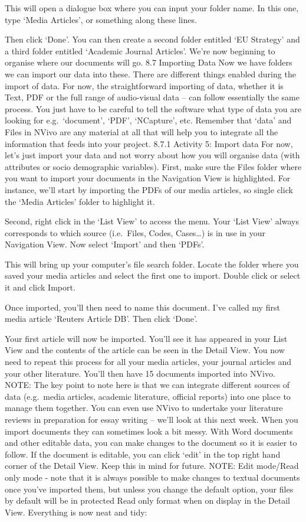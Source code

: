 \documentclass[
]{book}
\begin{document}
This will open a dialogue box where you can input your folder name. In this one, type `Media Articles', or something along these lines.

Then click `Done'. You can then create a second folder entitled `EU Strategy' and a third folder entitled `Academic Journal Articles'. We're now beginning to organise where our documents will go.
8.7 Importing Data
Now we have folders we can import our data into these.
There are different things enabled during the import of data. For now, the straightforward importing of data, whether it is Text, PDF or the full range of audio-visual data -- can follow essentially the same process. You just have to be careful to tell the software what type of data you are looking for e.g.~`document', `PDF', `NCapture', etc.
Remember that `data' and Files in NVivo are any material at all that will help you to integrate all the information that feeds into your project.
8.7.1 Activity 5: Import data
For now, let's just import your data and not worry about how you will organise data (with attributes or socio demographic variables). First, make sure the Files folder where you want to import your documents in the Navigation View is highlighted. For instance, we'll start by importing the PDFs of our media articles, so single click the `Media Articles' folder to highlight it.

Second, right click in the `List View' to access the menu. Your `List View' always corresponds to which source (i.e.~Files, Codes, Cases\ldots) is in use in your Navigation View. Now select `Import' and then `PDFs'.

This will bring up your computer's file search folder. Locate the folder where you saved your media articles and select the first one to import. Double click or select it and click Import.

Once imported, you'll then need to name this document. I've called my first media article `Reuters Article DB'. Then click `Done'.

Your first article will now be imported. You'll see it has appeared in your List View and the contents of the article can be seen in the Detail View.
You now need to repeat this process for all your media articles, your journal articles and your other literature. You'll then have 15 documents imported into NVivo.
NOTE: The key point to note here is that we can integrate different sources of data (e.g.~media articles, academic literature, official reports) into one place to manage them together. You can even use NVivo to undertake your literature reviews in preparation for essay writing -- we'll look at this next week.
When you import documents they can sometimes look a bit messy. With Word documents and other editable data, you can make changes to the document so it is easier to follow. If the document is editable, you can click `edit' in the top right hand corner of the Detail View. Keep this in mind for future.
NOTE: Edit mode/Read only mode - note that it is always possible to make changes to textual documents once you've imported them, but unless you change the default option, your files by default will be in protected Read only format when on display in the Detail View.
Everything is now neat and tidy:
\end{document}
